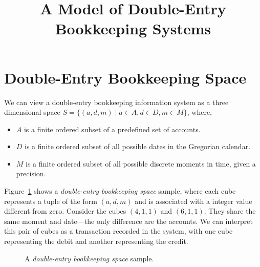 \documentclass{article}
\begin{document}
\title{A Model of Double-Entry Bookkeeping Systems}
\author{}
\date{}
\maketitle

\section{Double-Entry Bookkeeping Space}

We can view a double-entry bookkeeping information system as a 
three dimensional space $S=\{(a,d,m)\mid a\in A, d\in D, m\in M\}$, where,

\begin{itemize}
	\item $A$ is a finite ordered subset of a predefined set of accounts.
	\item $D$ is a finite ordered subset of all 
		possible dates in the Gregorian calendar.
	\item $M$ is a finite ordered subset of all 
		possible discrete moments in time, given a precision.
\end{itemize}

Figure~\ref{fig:deb-space-sample} shows a \emph{double-entry bookkeeping space} sample, 
where each cube represents a tuple of the form $(a,d,m)$ and is associated with
a integer value different from zero.
Consider the cubes $(4,1,1)$ and $(6,1,1)$. They share the same moment 
and date---the only difference are the accounts. 
We can interpret this pair of cubes as a transaction recorded in the system,
with one cube representing the debit and another representing the credit.

\begin{figure}[h]
\centering
{}
\label{fig:deb-space-sample}
\caption{A \emph{double-entry bookkeeping space} sample.}
\end{figure}
\end{document}
